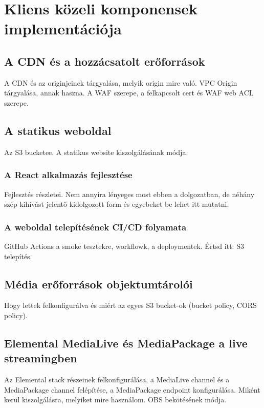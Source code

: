 \chapter{Kliens közeli komponensek implementációja}

\section{A CDN és a hozzácsatolt erőforrások}

A CDN és az originjeinek tárgyalása, melyik origin mire való. VPC Origin tárgyalása, annak haszna. A WAF szerepe, a felkapcsolt cert és WAF web ACL szerepe.

\section{A statikus weboldal}

Az S3 bucketee. A statikus website kiszolgálásának módja.

\subsection{A React alkalmazás fejlesztése}

Fejlesztés részletei. Nem annyira lényeges most ebben a dolgozatban, de néhány szép kihívást jelentő kidolgozott form és egyebeket be lehet itt mutatni.

\subsection{A weboldal telepítésének CI/CD folyamata}

GitHub Actions a smoke tesztekre, workflowk, a deploymentek. Értsd itt: S3 telepítés.

\section{Média erőforrások objektumtárolói}

Hogy lettek felkonfigurálva és miért az egyes S3 bucket-ok (bucket policy, CORS policy).

\section{Elemental MediaLive és MediaPackage a live streamingben}

Az Elemental stack részeinek felkonfigurálása, a MediaLive channel és a MediaPackage channel felépítése, a MediaPackage endpoint konfigurálása. Miként kerül kiszolgálásra, melyiket mire használom. OBS bekötésének módja.
